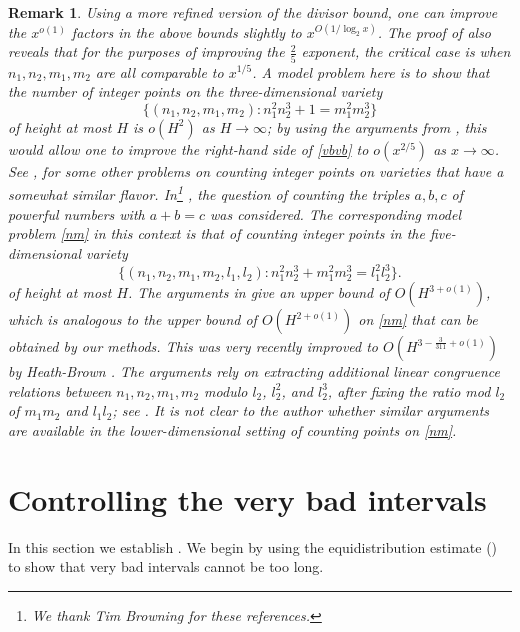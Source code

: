 \documentclass[12pt]{amsart}
\newtheorem{remark}[theorem]{Remark}
\begin{document}
\begin{remark}\label{rem-divisor}  Using a more refined version of the divisor bound, one can improve the $x^{o(1)}$ factors in the above bounds slightly to $x^{O(1/\log_2 x)}$.  The proof of  also reveals that for the purposes of improving the $\frac{2}{5}$ exponent, the critical case is when $n_1, n_2, m_1, m_2$ are all comparable to $x^{1/5}$.  A model problem here is to show that the number of integer points on the three-dimensional variety
\begin{equation}\label{nm}
\{ (n_1,n_2,m_1,m_2): n_1^2 n_2^3+1 = m_1^2 m_2^3\}
\end{equation}
of height at most $H$ is $o(H^2)$ as $H \to \infty$; by using the arguments from \cite{aktas}, this would allow one to improve the right-hand side of \eqref{vbvb} to $o(x^{2/5})$ as $x \to \infty$.  See \cite{tao-elsholtz}, \cite{hb-cubic} for some other problems on counting integer points on varieties that have a somewhat similar flavor.  In\footnote{We thank Tim Browning for these references.} \cite{browning-vanvalckenborgh}, the question of counting the triples $a,b,c$ of powerful numbers with $a+b=c$ was considered.  The corresponding model problem \eqref{nm} in this context is that of counting integer points in the five-dimensional variety
$$\{ (n_1,n_2,m_1,m_2, l_1, l_2): n_1^2 n_2^3+ m_1^2 m_2^3 = l_1^2 l_2^3\}.$$
of height at most $H$.  The arguments in \cite{browning-vanvalckenborgh} give an upper bound of $O(H^{3+o(1)})$, which is analogous to the upper bound of $O(H^{2+o(1)})$ on \eqref{nm} that can be obtained by our methods.  This was very recently improved to $O(H^{3-\frac{3}{311}+o(1)})$ by Heath-Brown \cite{hb-counting}.  The arguments rely on extracting additional linear congruence relations between $n_1, n_2, m_1, m_2$ modulo $l_2$, $l_2^2$, and $l_2^3$, after fixing the ratio mod $l_2$ of $m_1 m_2$ and $l_1 l_2$; see \cite[Lemma 4.1]{hb-counting}.  It is not clear to the author whether similar arguments are available in the lower-dimensional setting of counting points on \eqref{nm}.
\end{remark}



\section{Controlling the very bad intervals}\label{verybad-sec}

In this section we establish .  We begin by using the equidistribution estimate () to show that very bad intervals cannot be too long.
\end{document}
